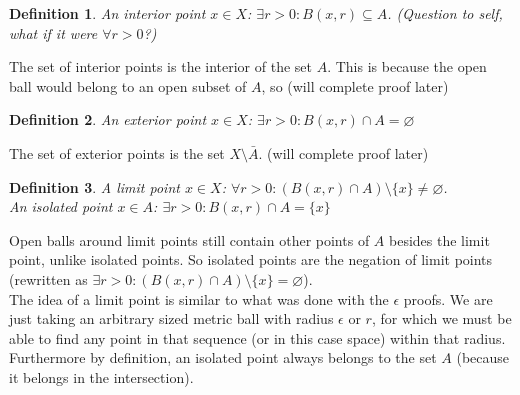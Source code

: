 \documentclass{article}
\newtheorem{defn}{Definition}[section]
\begin{document}
\medskip
\begin{defn}
An interior point $x \in X$: $\exists r > 0: B(x, r) \subseteq A$. (Question to self, what if it were $\forall r > 0$?)
\end{defn}
The set of interior points is the interior of the set $A$. This is because the open ball would belong to an open subset of $A$, so (will complete proof later)

\begin{defn}
An exterior point $x \in X$: $\exists r > 0: B(x, r) \cap A = \varnothing$
\end{defn}
The set of exterior points is the set $X \setminus \bar{A}$. (will complete proof later)

\medskip
\begin{defn}
A limit point $x \in X$: $\forall r > 0: (B(x, r) \cap A) \setminus \{x\} \neq \varnothing$.\\
An isolated point $x \in A$: $\exists r > 0: B(x, r) \cap A = \{x\}$
\end{defn}
Open balls around limit points still contain other points of $A$ besides the limit point, unlike isolated points. So isolated points are the negation of limit points (rewritten as $\exists r > 0: (B(x, r) \cap A)\setminus \{x\} = \varnothing$).\\

The idea of a limit point is similar to what was done with the $\epsilon$ proofs. We are just taking an arbitrary sized metric ball with radius $\epsilon$ or $r$, for which we must be able to find any point in that sequence (or in this case space) within that radius.\\

Furthermore by definition, an isolated point always belongs to the set $A$ (because it belongs in the intersection).
\end{document}
